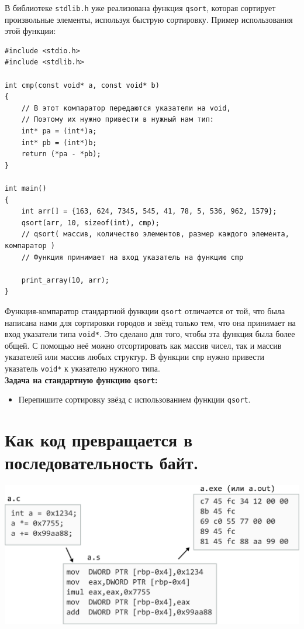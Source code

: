 \documentclass[10pt]{article}
\begin{document}
В библиотеке \texttt{stdlib.h} уже реализована функция \texttt{qsort}, которая сортирует произвольные элементы, используя быструю сортировку. Пример использования этой функции:
\begin{lstlisting}
#include <stdio.h>
#include <stdlib.h>

int cmp(const void* a, const void* b)
{
    // В этот компаратор передаются указатели на void,
    // Поэтому их нужно привести в нужный нам тип:
    int* pa = (int*)a;
    int* pb = (int*)b;
    return (*pa - *pb);
}

int main()
{
    int arr[] = {163, 624, 7345, 545, 41, 78, 5, 536, 962, 1579};
    qsort(arr, 10, sizeof(int), cmp);
    // qsort( массив, количество элементов, размер каждого элемента, компаратор )
    // Функция принимает на вход указатель на функцию cmp
   
    print_array(10, arr);
}
\end{lstlisting}
Функция-компаратор стандартной функции \texttt{qsort} отличается от той, что была написана нами для сортировки
городов и звёзд только тем, что она принимает на вход указатели типа \texttt{void*}. Это сделано для того, чтобы эта функция была более общей. С помощью неё можно отсортировать как массив чисел, так и массив указателей или массив любых структур. В функции \texttt{cmp} нужно привести указатель \texttt{void*} к указателю нужного типа.\\
\textbf{Задача на стандартную функцию \texttt{qsort}:}
\begin{itemize}
\item Перепишите сортировку звёзд с использованием функции \texttt{qsort}.
\end{itemize}



\newpage
\section*{Как код превращается в последовательность байт.}
\begin{center}
\includegraphics[scale=0.9]{../images/code_to_hex.png}
\end{center}
\end{document}

